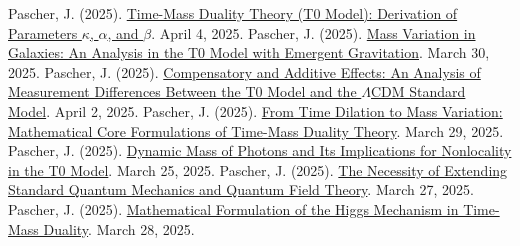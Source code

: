 \documentclass[a4paper,12pt]{article}
\begin{document}
	\begin{thebibliography}{99}
		 Pascher, J. (2025). \href{https://github.com/jpascher/T0-Time-Mass-Duality/tree/main/2/pdf/English/ZeitMasseT0ParamsEn.pdf}{Time-Mass Duality Theory (T0 Model): Derivation of Parameters \(\kappa\), \(\alpha\), and \(\beta\)}. April 4, 2025.
		 Pascher, J. (2025). \href{https://github.com/jpascher/T0-Time-Mass-Duality/tree/main/2/pdf/English/MassVarGalaxienEn.pdf}{Mass Variation in Galaxies: An Analysis in the T0 Model with Emergent Gravitation}. March 30, 2025.
		 Pascher, J. (2025). \href{https://github.com/jpascher/T0-Time-Mass-Duality/tree/main/2/pdf/English/MessdifferenzenT0StandardEn.pdf}{Compensatory and Additive Effects: An Analysis of Measurement Differences Between the T0 Model and the \(\Lambda\)CDM Standard Model}. April 2, 2025.
		 Pascher, J. (2025). \href{https://github.com/jpascher/T0-Time-Mass-Duality/tree/main/2/pdf/English/MathZeitMasseLagrange.pdf}{From Time Dilation to Mass Variation: Mathematical Core Formulations of Time-Mass Duality Theory}. March 29, 2025.
		 Pascher, J. (2025). \href{https://github.com/jpascher/T0-Time-Mass-Duality/tree/main/2/pdf/English/DynMassePhotonenNichtlokalEn.pdf}{Dynamic Mass of Photons and Its Implications for Nonlocality in the T0 Model}. March 25, 2025.
		 Pascher, J. (2025). \href{https://github.com/jpascher/T0-Time-Mass-Duality/tree/main/2/pdf/English/NotwendigkeitQMErweiterungEn.pdf}{The Necessity of Extending Standard Quantum Mechanics and Quantum Field Theory}. March 27, 2025.
		 Pascher, J. (2025). \href{https://github.com/jpascher/T0-Time-Mass-Duality/tree/main/2/pdf/English/MathHiggsZeitMasseEn.pdf}{Mathematical Formulation of the Higgs Mechanism in Time-Mass Duality}. March 28, 2025.
	\end{thebibliography}
	
\end{document}
